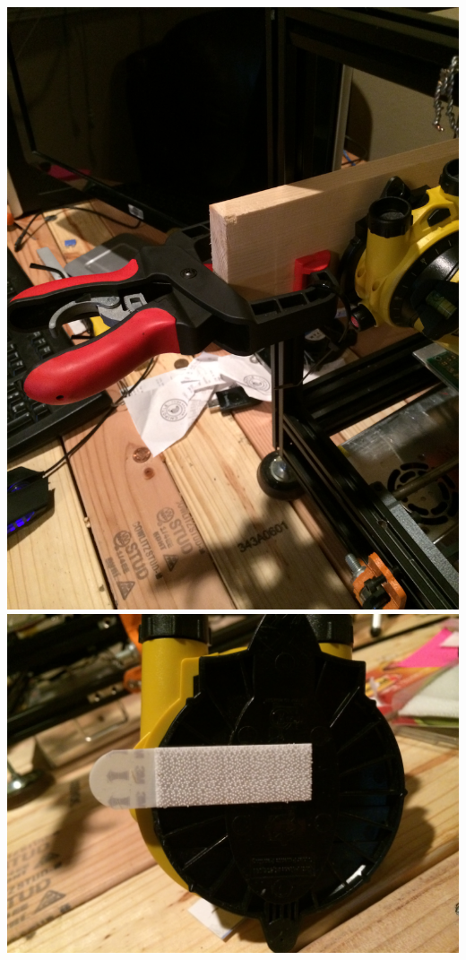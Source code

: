 \documentclass[12pt]{article}
\begin{document}
\includegraphics[scale=0.1,angle=270]{images/volume_analysis_setup/IMG_0610.JPG}
\includegraphics[scale=0.1,angle=270]{images/volume_analysis_setup/IMG_0611.JPG}
\end{document}
